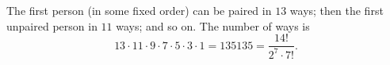 The first person (in some fixed order) can be paired in $13$ ways; then the first unpaired person in $11$ ways; and so on. The number of ways is
\[
13\cdot11\cdot9\cdot7\cdot5\cdot3\cdot1=\boxed{135135}=\dfrac{14!}{2^7\cdot7!}.
\]
